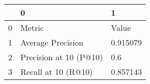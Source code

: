 \begin{tabular}{lll}
\toprule
{} &                       0 &         1 \\
\midrule
0 &                  Metric &     Value \\
1 &       Average Precision &  0.915079 \\
2 &  Precision at 10 (P@10) &       0.6 \\
3 &     Recall at 10 (R@10) &  0.857143 \\
\bottomrule
\end{tabular}
